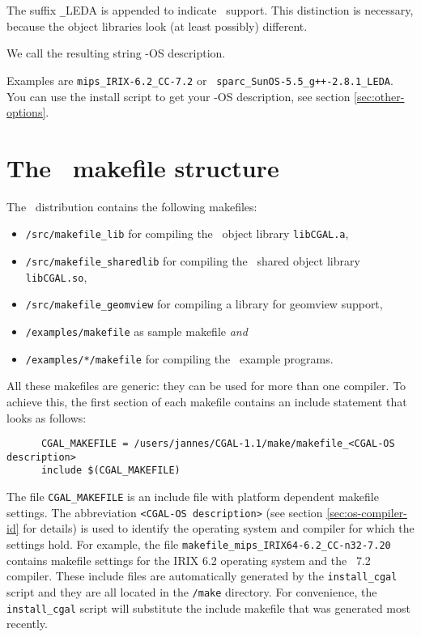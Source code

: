 The suffix \texttt{\_}LEDA is appended to indicate \leda\ support. This
distinction is necessary, because the object libraries look (at least
possibly) different.

We call the resulting string \cgal-OS description. 

Examples are \texttt{mips\_IRIX-6.2\_CC-7.2} or {\tt
  sparc\_SunOS-5.5\_g++-2.8.1\_LEDA}. You can use the install
script to get your \cgal-OS description, see section
\ref{sec:other-options}.

\section{The \cgal\ makefile structure \label{sec:makefiles}}

The \cgal\ distribution contains the following makefiles:
\begin{itemize}
\item \texttt{\cgaldir/src/makefile\_lib} for compiling the \cgal\ 
  object library \texttt{libCGAL.a},
  
\item \texttt{\cgaldir/src/makefile\_sharedlib} for compiling the
  \cgal\ shared object library \texttt{libCGAL.so},
  
\item \texttt{\cgaldir/src/makefile\_geomview} for compiling a library
  for geomview support,
  
\item \texttt{\cgaldir/examples/makefile} as sample makefile
  \textit{and}
  
\item \texttt{\cgaldir/examples/*/makefile} for compiling the \cgal\ 
  example programs.
\end{itemize}

All these makefiles are generic: they can be used for more than one
compiler.  To achieve this, the first section of each makefile
contains an include statement that looks as follows:

\begin{verbatim}
      CGAL_MAKEFILE = /users/jannes/CGAL-1.1/make/makefile_<CGAL-OS description>
      include $(CGAL_MAKEFILE)
\end{verbatim}

The file \texttt{CGAL\_MAKEFILE} is an include file with platform
dependent makefile settings. The abbreviation \texttt{<CGAL-OS
  description>} (see section \ref{sec:os-compiler-id} for details) is
used to identify the operating system and compiler for which the
settings hold. For example, the file
\texttt{makefile\_mips\_IRIX64-6.2\_CC-n32-7.20} contains makefile
settings for the IRIX 6.2 operating system and the \mipsprocc\ 7.2
compiler.  These include files are automatically generated by the
\texttt{install\_cgal} script and they are all located in the
\texttt{\cgaldir/make} directory.  For convenience, the
\texttt{install\_cgal} script will substitute the include makefile
that was generated most recently.

